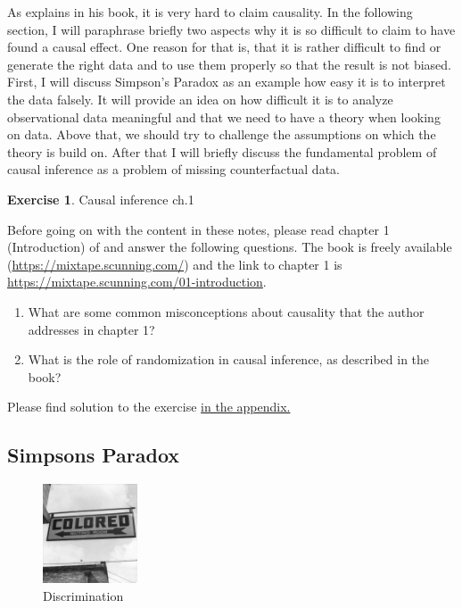 \documentclass[
  12pt,
  oneside]{book}
\theoremstyle{definition}
\theoremstyle{definition}
\theoremstyle{definition}
\newtheorem{exercise}{Exercise}[chapter]
\theoremstyle{definition}
\theoremstyle{remark}
\begin{document}
As \citet{Cunningham2021Causal} explains in his book, it is very hard to claim causality. In the following section, I will paraphrase briefly two aspects why it is so difficult to claim to have found a causal effect. One reason for that is, that it is rather difficult to find or generate the right data and to use them properly so that the result is not biased. First, I will discuss Simpson's Paradox as an example how easy it is to interpret the data falsely. It will provide an idea on how difficult it is to analyze observational data meaningful and that we need to have a theory when looking on data. Above that, we should try to challenge the assumptions on which the theory is build on. After that I will briefly discuss the fundamental problem of causal inference as a problem of missing counterfactual data.

\begin{exercise}
\protect\hypertarget{exr:causalinf1}{}\label{exr:causalinf1}Causal inference ch.1

Before going on with the content in these notes, please read chapter 1 (Introduction) of \citet{Cunningham2021Causal} and answer the following questions. The book is freely available (\url{https://mixtape.scunning.com/}) and the link to chapter 1 is \url{https://mixtape.scunning.com/01-introduction}.

\begin{enumerate}
\def\labelenumi{\arabic{enumi}.}
\item
  What are some common misconceptions about causality that the author addresses in chapter 1?
\item
  What is the role of randomization in causal inference, as described in the book?
\end{enumerate}

Please find solution to the exercise \protect\hyperlink{sol:causalinf1}{in the appendix.}
\end{exercise}

\hypertarget{simpsons-paradox}{%
\subsection{Simpsons Paradox}\label{simpsons-paradox}}

\begin{figure}
\centering
\includegraphics[width=0.25\textwidth,height=\textheight]{fig/1943_Colored_Waiting_Room_Sign.jpg}
\caption[\label{fig:waitingroom} Discrimination]{\label{fig:waitingroom} Discrimination\footnotemark{}}
\end{figure}
\end{document}
